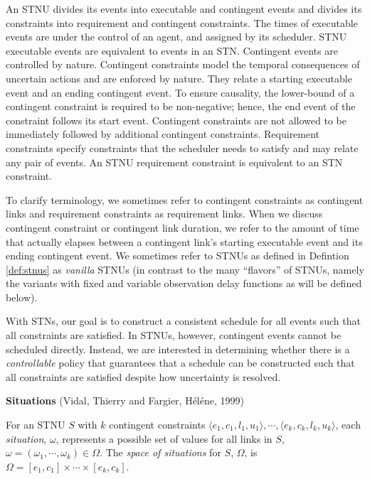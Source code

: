 \documentclass[11pt]{article}
\begin{document}
An STNU divides its events into executable and contingent events and divides its constraints into
requirement and contingent constraints. The times of executable events are under the control of an
agent, and assigned by its scheduler. STNU executable events are equivalent to events in an STN.
Contingent events are controlled by nature. Contingent constraints model the temporal consequences
of uncertain actions and are enforced by nature. They relate a starting executable event and an
ending contingent event. To ensure causality, the lower-bound of a contingent constraint is required
to be non-negative; hence, the end event of the constraint follows its start event. Contingent
constraints are not allowed to be immediately followed by additional contingent constraints.
Requirement constraints specify constraints that the scheduler needs to satisfy and may relate any
pair of events. An STNU requirement constraint is equivalent to an STN constraint.

To clarify terminology, we sometimes refer to contingent constraints as contingent links and
requirement constraints as requirement links. When we discuss contingent constraint or contingent
link duration, we refer to the amount of time that actually elapses between a contingent link's
starting executable event and its ending contingent event. We sometimes refer to STNUs as defined in
Defintion \ref{def:stnus} as \emph{vanilla} STNUs (in contrast to the many ``flavors'' of STNUs, namely the
variants with fixed and variable observation delay functions as will be defined below).

With STNs, our goal is to construct a consistent schedule for all events such that all constraints
are satisfied. In STNUs, however, contingent events cannot be scheduled directly. Instead, we are
interested in determining whether there is a \emph{controllable} policy that guarantees that a schedule
can be constructed such that all constraints are satisfied despite how uncertainty is resolved.

\begin{defn}
\textbf{Situations} (Vidal, Thierry and Fargier, H{\'e}l{\'e}ne, 1999)

For an STNU \(S\) with \(k\) contingent constraints \(\langle e_{1}, c_{1}, l_{1}, u_{1} \rangle, \cdots,
\langle e_{k}, c_{k}, l_{k}, u_{k} \rangle\), each \textit{situation}, \(\omega\), represents a
possible set of values for all links in \(S\), \(\omega = (\omega_{1}, \cdots, \omega_{k}) \in \Omega\).
The \textit{space of situations} for \(S\), \(\Omega\), is \(\Omega = [e_{1}, c_{1}] \times \cdots \times
[e_{k}, c_{k}]\).
\end{defn}
\end{document}
